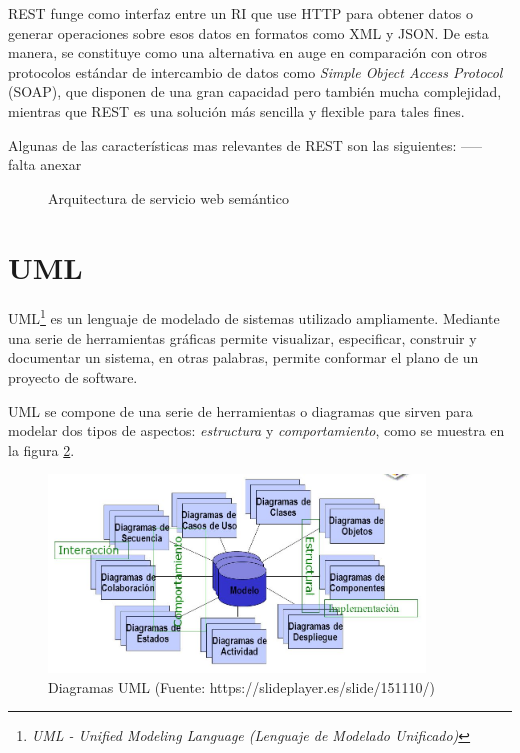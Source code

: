 REST funge como interfaz entre un RI que use HTTP para obtener datos o generar operaciones sobre esos datos en formatos como XML y JSON. De esta manera, se constituye como una alternativa en auge en comparación con otros protocolos estándar de intercambio de datos como \textit{Simple Object Access Protocol} (SOAP), que disponen de una gran capacidad pero también mucha complejidad, mientras que REST es una solución más sencilla y flexible para tales fines.

Algunas de las características mas relevantes de REST son las siguientes: ----- falta anexar

\begin{figure}[!ht]
	\centering
    \caption{Arquitectura de servicio web semántico} %
    \label{arquitect1}
\end{figure}


\section{UML}

UML\footnote{\textit{UML - Unified Modeling Language (Lenguaje de Modelado Unificado)}} es un lenguaje de modelado de sistemas utilizado ampliamente. Mediante una serie de herramientas gráficas permite visualizar, especificar, construir y documentar un sistema, en otras palabras, permite conformar el plano de un proyecto de software.\newline

UML se compone de una serie de herramientas o diagramas que sirven para modelar dos tipos de aspectos: \textit{estructura} y \textit{comportamiento}, como se muestra en la figura \ref{diagramas_UML}.

\begin{figure}[!ht]
    \centering
    \includegraphics[width=10cm]{figures/diagramas_UML.png} %
    \caption{Diagramas UML (Fuente: https://slideplayer.es/slide/151110/)} %
    \label{diagramas_UML}
\end{figure}


